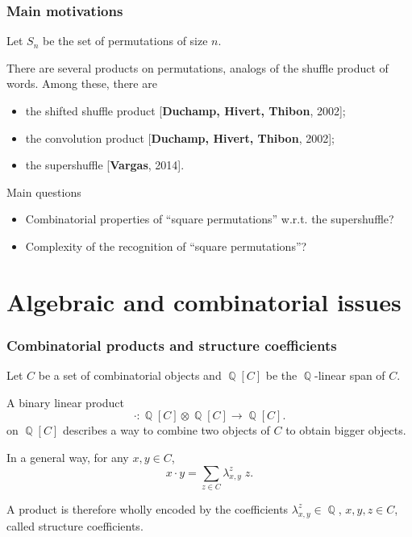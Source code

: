 \documentclass[unknownkeysallowed,10pt,xcolor={dvipsnames}]{beamer}
\DeclareMathOperator{\QQ}{\mathbb{Q}}
\newcommand{\BIB}[2]{{\footnotesize\textcolor{MidnightBlue!85}{[\textbf{#1}, #2]}}}
\begin{document}
\begin{frame} \frametitle{Main motivations}
Let $S_n$ be the set of permutations of size $n$.
\medskip

There are several products on permutations, analogs of the shuffle
product of words. Among these, there are
\smallskip

\begin{itemize}
    \item the shifted shuffle product \BIB{Duchamp, Hivert, Thibon}{2002};
    \medskip

    \item the convolution product \BIB{Duchamp, Hivert, Thibon}{2002};
    \medskip

    \item the supershuffle \BIB{Vargas}{2014}.
\end{itemize}
\medskip

\begin{block}{Main questions}
    \begin{itemize}
        \item Combinatorial properties of ``square permutations''
        w.r.t. the supershuffle?
        \medskip

        \item Complexity of the recognition of ``square permutations''?
    \end{itemize}
\end{block}
\end{frame}



\section{Algebraic and combinatorial issues}

\begin{frame} \frametitle{Combinatorial products and structure coefficients}
Let $C$ be a set of combinatorial objects and $\QQ[C]$ be the
$\QQ$-linear span of $C$.
\medskip

A binary linear product
\begin{equation*}
    \cdot : \QQ[C] \otimes \QQ[C] \to \QQ[C].
\end{equation*}
on $\QQ[C]$ describes a way to \alert{combine} two objects of
$C$ to obtain \alert{bigger} objects.
\medskip

In a general way, for any $x, y \in C$,
\begin{equation*}
    x \cdot y = \sum_{z \in C} \lambda_{x, y}^z \; z.
\end{equation*}
\medskip

A product is therefore wholly encoded by the coefficients
$\lambda_{x, y}^z \in \QQ$, $x, y, z \in C$, called
\alert{structure coefficients}.
\end{frame}
\end{document}
